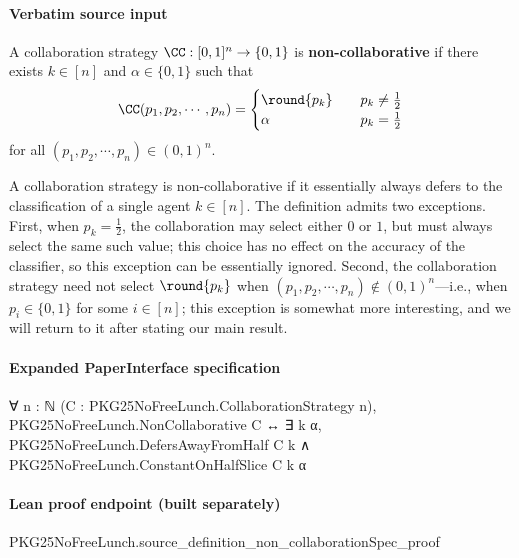 \documentclass[10pt]{article}
\begin{document}
\paragraph{Verbatim source input}
\begin{ReviewVerbatim}
\begin{definition}\label{def:non-collaborative}
    A collaboration strategy $\CC:[0,1]^n\rightarrow \{0,1\}$ is \textbf{non-collaborative} if there exists $k\in [n]$ and $\alpha\in \{0,1\}$ such that
    \begin{equation}
    \CC(p_1,p_2,\cdots,p_n) =
        \begin{cases}
        \round{p_k} &\quad \text{$p_k\neq \frac{1}{2}$} \\
            \alpha &\quad \text{$p_k=\frac{1}{2}$}
        \end{cases}
    \end{equation}
    for all $(p_1,p_2,\cdots,p_n)\in (0,1)^n$.
\end{definition}

A collaboration strategy is non-collaborative if it essentially always defers to the classification of a single agent $k\in [n]$. The definition admits two exceptions. First, when $p_k = \frac{1}{2}$, the collaboration may select either $0$ or $1$, but must always select the same such value; this choice has no effect on the accuracy of the classifier, so this exception can be essentially ignored. Second, the collaboration strategy need not select $\round{p_k}$ when $(p_1,p_2,\cdots,p_n)\notin (0,1)^n$---i.e., when $p_i\in \{0,1\}$ for some $i\in [n]$; this exception is somewhat more interesting, and we will return to it after stating our main result.
\end{ReviewVerbatim}


\paragraph{Expanded PaperInterface specification}
\begin{ReviewVerbatim}
∀ {n : ℕ} (C : PKG25NoFreeLunch.CollaborationStrategy n),
  PKG25NoFreeLunch.NonCollaborative C ↔
    ∃ k α, PKG25NoFreeLunch.DefersAwayFromHalf C k ∧ PKG25NoFreeLunch.ConstantOnHalfSlice C k α
\end{ReviewVerbatim}

\paragraph{Lean proof endpoint (built separately)}\begin{ReviewVerbatim}
PKG25NoFreeLunch.source_definition_non_collaborationSpec_proof
\end{ReviewVerbatim}
\end{document}
